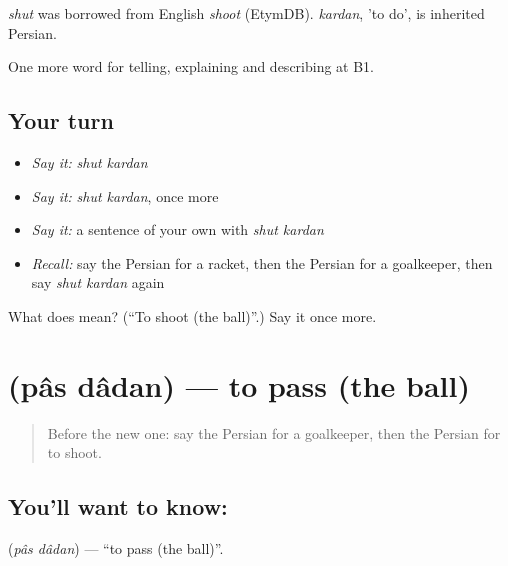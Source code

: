 \begin{cousinweb}
\emph{shut} was borrowed from English \emph{shoot} (EtymDB). \emph{kardan}, 'to do', is inherited Persian.
\end{cousinweb}

\begin{grammarlens}[title={What you've built}]
One more word for telling, explaining and describing at B1.
\end{grammarlens}

\subsection*{Your turn}
\begin{itemize}
\raggedright
  \item \emph{Say it:} \emph{shut kardan}
  \item \emph{Say it:} \emph{shut kardan}, once more
  \item \emph{Say it:} a sentence of your own with \emph{shut kardan}
  \item \emph{Recall:} say the Persian for a racket, then the Persian for a goalkeeper, then say \emph{shut kardan} again
\end{itemize}

\begin{tcolorbox}[breakable,colback=teal!4,colframe=teal!35!black,title={Before you move on}]
What does   mean? (\textquotedblleft{}To shoot (the ball)\textquotedblright{}.) Say it once more.
\end{tcolorbox}
\section[\texorpdfstring{\fa{پاس} \fa{دادن} (pâs dâdan)}{پاس دادن (pâs dâdan)}]{  (pâs dâdan) — to pass (the ball)}

\label{lesson:FA-C515-pas-dadan}



\begin{quote}
Before the new one: say the Persian for a goalkeeper, then the Persian for to shoot.
\end{quote}

\subsection*{You'll want to know:  }
\textbf{ } (\emph{pâs dâdan}) — \textquotedblleft{}to pass (the ball)\textquotedblright{}.

